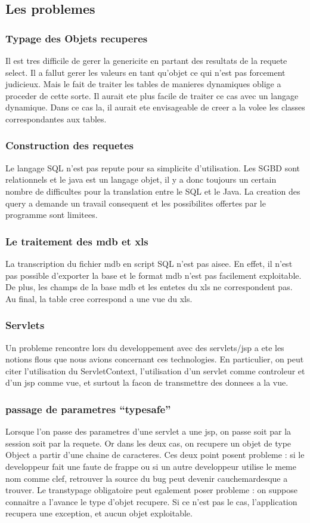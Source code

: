 \subsection{Les problemes}
\subsubsection{Typage des Objets recuperes}
Il est tres difficile de gerer la genericite en partant des resultats de la requete select. Il a fallut gerer les valeurs en tant qu'objet ce qui n'est pas forcement judicieux. Mais le fait de traiter les tables de manieres dynamiques oblige a proceder de cette sorte. Il aurait ete plus facile de traiter ce cas avec un langage dynamique. Dans ce cas la, il aurait ete envisageable de creer a la volee les classes correspondantes aux tables.
\subsubsection{Construction des requetes}
Le langage SQL n'est pas repute pour sa simplicite d'utilisation. Les SGBD sont relationnels et le java est un langage objet, il y a donc toujours un certain nombre de difficultes pour la translation entre le SQL et le Java. La creation des query a demande un travail consequent et les possibilites offertes par le programme sont limitees.
\subsubsection{Le traitement des mdb et xls}
La transcription du fichier mdb en script SQL n'est pas aisee. En effet, il n'est pas possible d'exporter la base et le format mdb n'est pas facilement exploitable. De plus, les champs de la base mdb et les entetes du xls ne correspondent pas. Au final, la table cree correspond a une vue du xls.

\subsubsection{Servlets}
Un probleme rencontre lors du developpement avec des servlets/jsp a ete les notions flous que nous avions concernant ces technologies. En particulier, on peut citer l'utilisation du ServletContext, l'utilisation d'un servlet comme controleur et d'un jsp comme vue, et surtout la facon de transmettre des donnees a la vue.

\subsubsection{passage de parametres ``typesafe''}
Lorsque l'on passe des parametres d'une servlet a une jsp, on passe soit par la session soit par la requete. Or dans les deux cas, on recupere un objet de type Object a partir d'une chaine de caracteres. Ces deux point posent probleme : si le developpeur fait une faute de frappe ou si un autre developpeur utilise le meme nom comme clef, retrouver la source du bug peut devenir cauchemardesque a trouver. Le transtypage obligatoire peut egalement poser probleme : on suppose connaitre a l'avance le type d'objet recupere. Si ce n'est pas le cas, l'application recupera une exception, et aucun objet exploitable.

